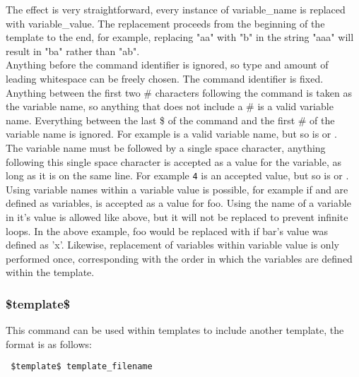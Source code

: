\documentclass{settings/TU_Delft_Report}
\begin{document}
The effect is very straightforward, every instance of variable\_name is replaced with variable\_value. The replacement proceeds from the beginning of the template to the end, for example, replacing "aa" with "b" in the string "aaa" will result in "ba" rather than "ab".\\

Anything before the command identifier is ignored, so type and amount of leading whitespace can be freely chosen. The  command identifier is fixed.\\

Anything between the first two \# characters following the  command is taken as the variable name, so anything that does not include a \# is a valid variable name. Everything between the last \$ of the command and the first \# of the variable name is ignored. For example  is a valid variable name, but so is  or .\\

The variable name must be followed by a single space character, anything following this single space character is accepted as a value for the variable, as long as it is on the same line. For example \lstinline{4} is an accepted value, but so is  or  .\\

Using variable names within a variable value is possible, for example if  and  are defined as variables,  is accepted as a value for foo. Using the name of a variable in it's value is allowed like above, but it will not be replaced to prevent infinite loops. In the above example, foo would be replaced with  if bar's value was defined as 'x'. Likewise, replacement of variables within variable value is only performed once, corresponding with the order in which the variables are defined within the template.

\subsubsection{\$template\$}
This command can be used within templates to include another template, the format is as follows:
\begin{lstlisting}
 $template$ template_filename
\end{lstlisting}
\end{document}
